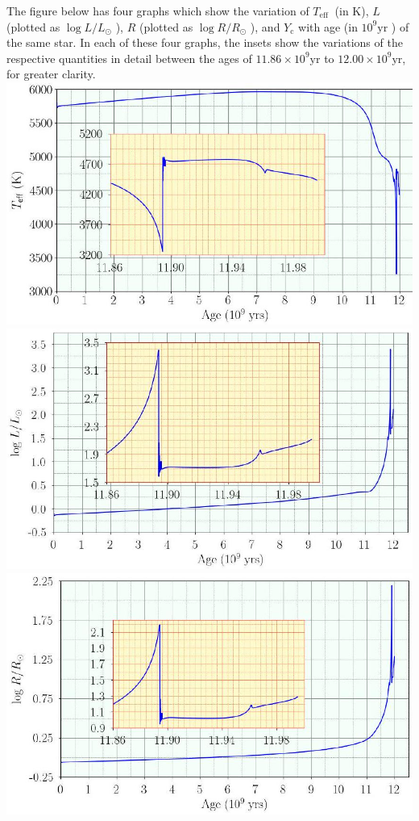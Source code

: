 \documentclass[10pt]{article}
\begin{document}
    The figure below has four graphs which show the variation of $T_{\text {eff }}$ (in K), $L$ (plotted as $\log L / L_{\odot}$ ), $R$ (plotted as $\log R / R_{\odot}$ ), and $Y_{\mathrm{c}}$ with age (in $10^{9} \mathrm{yr}$ ) of the same star. In each of these four graphs, the insets show the variations of the respective quantities in detail between the ages of $11.86 \times 10^{9} \mathrm{yr}$ to $12.00 \times 10^{9} \mathrm{yr}$, for greater clarity.\\
    \includegraphics[max width=\textwidth, center]{2025_08_23_e94579452776a99c4850g-15(2)}\\
    \includegraphics[max width=\textwidth, center]{2025_08_23_e94579452776a99c4850g-15(3)}\\
    \includegraphics[max width=\textwidth, center]{2025_08_23_e94579452776a99c4850g-15}\\
\end{document}
